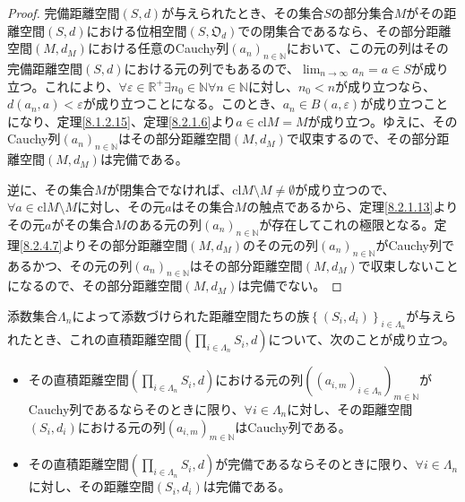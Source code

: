 \documentclass[dvipdfmx]{jsarticle}
\begin{document}
\begin{proof}
完備距離空間$(S,d)$が与えられたとき、その集合$S$の部分集合$M$がその距離空間$(S,d)$における位相空間$\left( S,\mathfrak{O}_{d} \right)$での閉集合であるなら、その部分距離空間$\left( M,d_{M} \right)$における任意のCauchy列$\left( a_{n} \right)_{n \in \mathbb{N}}$において、この元の列はその完備距離空間$(S,d)$における元の列でもあるので、$\lim_{n \rightarrow \infty}a_{n} = a \in S$が成り立つ。これにより、$\forall\varepsilon \in \mathbb{R}^{+}\exists n_{0} \in \mathbb{N}\forall n \in \mathbb{N}$に対し、$n_{0} < n$が成り立つなら、$d\left( a_{n},a \right) < \varepsilon$が成り立つことになる。このとき、$a_{n} \in B(a,\varepsilon)$が成り立つことになり、定理\ref{8.1.2.15}、定理\ref{8.2.1.6}より$a \in {\mathrm{cl}}M = M$が成り立つ。ゆえに、そのCauchy列$\left( a_{n} \right)_{n \in \mathbb{N}}$はその部分距離空間$\left( M,d_{M} \right)$で収束するので、その部分距離空間$\left( M,d_{M} \right)$は完備である。\par
逆に、その集合$M$が閉集合でなければ、${\mathrm{cl}}M \setminus M \neq \emptyset$が成り立つので、$\forall a \in {\mathrm{cl}}M \setminus M$に対し、その元$a$はその集合$M$の触点であるから、定理\ref{8.2.1.13}よりその元$a$がその集合$M$のある元の列$\left( a_{n} \right)_{n \in \mathbb{N}}$が存在してこれの極限となる。定理\ref{8.2.4.7}よりその部分距離空間$\left( M,d_{M} \right)$のその元の列$\left( a_{n} \right)_{n \in \mathbb{N}}$がCauchy列であるかつ、その元の列$\left( a_{n} \right)_{n \in \mathbb{N}}$はその部分距離空間$\left( M,d_{M} \right)$で収束しないことになるので、その部分距離空間$\left( M,d_{M} \right)$は完備でない。
\end{proof}
\begin{thm}\label{8.2.4.10}
添数集合$\varLambda_{n}$によって添数づけられた距離空間たちの族$\left\{ \left( S_{i},d_{i} \right) \right\}_{i \in \varLambda_{n}}$が与えられたとき、これの直積距離空間$\left( \prod_{i \in \varLambda_{n}} S_{i},d \right)$について、次のことが成り立つ。
\begin{itemize}
\item
  その直積距離空間$\left( \prod_{i \in \varLambda_{n}} S_{i},d \right)$における元の列$\left( \left( a_{i,m} \right)_{i \in \varLambda_{n}} \right)_{m \in \mathbb{N}}$がCauchy列であるならそのときに限り、$\forall i \in \varLambda_{n}$に対し、その距離空間$\left( S_{i},d_{i} \right)$における元の列$\left( a_{i,m} \right)_{m \in \mathbb{N}}$はCauchy列である。
\item
  その直積距離空間$\left( \prod_{i \in \varLambda_{n}} S_{i},d \right)$が完備であるならそのときに限り、$\forall i \in \varLambda_{n}$に対し、その距離空間$\left( S_{i},d_{i} \right)$は完備である。
\end{itemize}
\end{thm}
\end{document}
